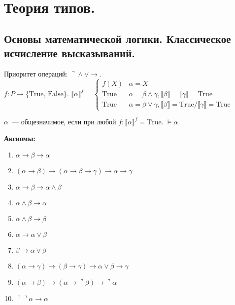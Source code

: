 \documentclass[12pt]{article}
\begin{document}
	
	
	
	
	\newpage
	\section{Теория типов.}
	\subsection{Основы математической логики. Классическое исчисление высказываний.}
	Приоритет операций: $\urcorner \wedge \vee \rightarrow$. \\
	$f: P \rightarrow \{ \text{True, False} \}$. $\llbracket \alpha \rrbracket^f =
	\begin{cases}
		f(X) & \alpha = X \\
		\text{True} & \alpha = \beta \wedge \gamma, \llbracket \beta \rrbracket = \llbracket \gamma \rrbracket = \text{True} \\
		\text{True} & \alpha = \beta \vee \gamma, \llbracket \beta \rrbracket = \text{True} / \llbracket \gamma \rrbracket = \text{True}
	\end{cases}$
	\begin{definition}
		$\alpha$~--- общезначимое, если при любой $f: \llbracket \alpha \rrbracket^f = \text{True}$. $\vDash \alpha$.
	\end{definition}
	\noindent
	\textbf{Аксиомы:}
	\begin{enumerate}
		\item $\alpha \rightarrow \beta \rightarrow \alpha$
		\item $(\alpha \rightarrow \beta) \rightarrow (\alpha \rightarrow \beta \rightarrow \gamma) \rightarrow \alpha \rightarrow \gamma$
		\item $\alpha \rightarrow \beta \rightarrow \alpha \wedge \beta$
		\item $\alpha \wedge \beta \rightarrow \alpha$
		\item $\alpha \wedge \beta \rightarrow \beta$
		\item $\alpha \rightarrow \alpha \vee \beta$
		\item $\beta \rightarrow \alpha \vee \beta$
		\item $(\alpha \rightarrow \gamma) \rightarrow (\beta \rightarrow \gamma) \rightarrow \alpha \vee \beta \rightarrow \gamma$
		\item $(\alpha \rightarrow \beta) \rightarrow (\alpha \rightarrow \urcorner \beta) \rightarrow \urcorner \alpha$
		\item $\urcorner \urcorner \alpha \rightarrow \alpha$
	\end{enumerate}
\end{document}
